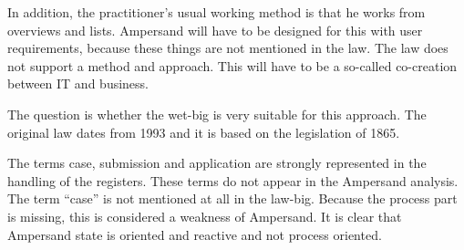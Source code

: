 In addition, the practitioner's usual working method is that he works from overviews and lists. 
Ampersand will have to be designed for this with user requirements, because these things are not mentioned in the law. 
The law does not support a method and approach. 
This will have to be a so-called co-creation between IT and business.

The question is whether the wet-big is very suitable for this approach. 
The original law dates from 1993 and it is based on the legislation of 1865.

The terms case, submission and application are strongly represented in the handling of the registers. 
These terms do not appear in the Ampersand analysis. The term “case” is not mentioned at all in the law-big.
Because the process part is missing, this is considered a weakness of Ampersand. 
It is clear that Ampersand state is oriented and reactive and not process oriented.